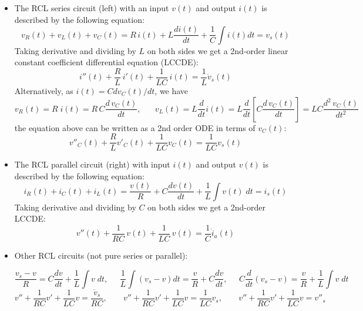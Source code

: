 \documentclass{article}
\begin{document}

\begin{itemize}
\item The RCL series circuit (left) with an input $v(t)$ and output $i(t)$
  is described by the following equation:
  \begin{equation} 
    v_R(t)+v_L(t)+v_C(t)=R\,i(t)+L\frac{di(t)}{dt}+\frac{1}{C}\int i(t) dt=v_s(t)
  \end{equation}
  Taking derivative and dividing by $L$ on both sides we get a 2nd-order
  linear constant coefficient differential equation (LCCDE):
  \begin{equation}
    i''(t)+\frac{R}{L}\,i'(t)+\frac{1}{LC}\,i(t)=\frac{1}{L}\dot{v}_s(t) 
  \end{equation}
  Alternatively, as $i(t)=C dv_C(t)/dt$, we have
  \begin{equation} 
    v_R(t)=R\;i(t)=R\,C\frac{d\,v_C(t)}{dt},\;\;\;\;\;\;
    v_L(t)=L\frac{d}{dt}i(t)=L\frac{d}{dt}\left[C\frac{d\,v_C(t)}{dt} \right]
    =LC\frac{d^2\,v_C(t)}{dt^2}
  \end{equation}
  the equation above can be written as a 2nd order ODE in terms of $v_C(t)$:
  \begin{equation} 
    v''_C(t)+\frac{R}{L} v'_C(t)+\frac{1}{LC}v_C(t)=\frac{1}{LC}v_s(t)
  \end{equation}
\item The RCL parallel circuit (right) with input $i(t)$ and output $v(t)$
  is described by the following equation:
  \begin{equation}
    i_R(t)+i_C(t)+i_L(t)=\frac{v(t)}{R}+C\frac{dv(t)}{dt}+\frac{1}{L}\int v(t)\;dt 
    =i_s(t) 
  \end{equation}
  Taking derivative and dividing by $C$ on both sides we get a 2nd-order 
  LCCDE:
  \begin{equation}
    v''(t)+\frac{1}{RC}\,v(t)+\frac{1}{LC}\,v(t)=\frac{1}{C}\dot{i}_a(t) 
  \end{equation}

\item Other RCL circuits (not pure series or parallel):

  \begin{equation}
    \frac{v_s-v}{R} = C\frac{dv}{dt}+\frac{1}{L} \int v\;dt,
    \;\;\;\;\;
    \frac{1}{L}\int (v_s-v)dt = \frac{v}{R}+C\frac{dv}{dt},
    \;\;\;\;\;
    C\frac{d}{dt} (v_s-v) = \frac{v}{R}+\frac{1}{L} \int v\;dt
  \end{equation}
  \begin{equation}
    v''+\frac{1}{RC} v'+\frac{1}{LC}v=\frac{\dot{v}_s}{RC},
    \;\;\;\;\;\;\;
    v''+\frac{1}{RC} v'+\frac{1}{LC}v=\frac{1}{LC}v_s,
    \;\;\;\;\;\;\;
    v''+\frac{1}{RC} v'+\frac{1}{LC}v=v''_s
  \end{equation}
\end{itemize}
\end{document}
